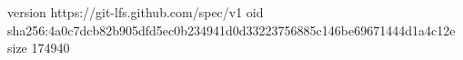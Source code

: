 version https://git-lfs.github.com/spec/v1
oid sha256:4a0c7dcb82b905dfd5ec0b234941d0d33223756885c146be69671444d1a4c12e
size 174940
